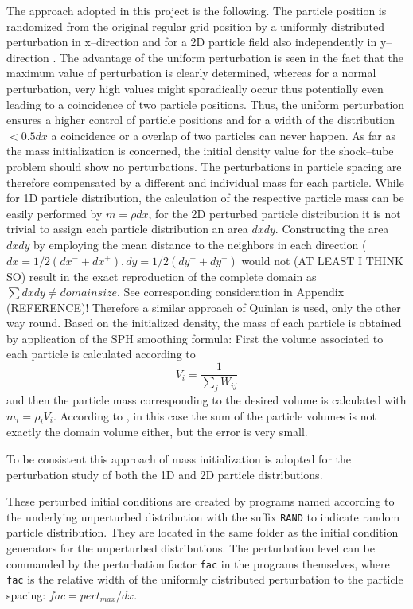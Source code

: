 \documentclass{report}
\begin{document}
 The approach adopted in this project is the following. The particle position is randomized from the original regular grid position by a uniformly distributed perturbation in x--direction and for a 2D particle field also independently in y--direction . The advantage of the uniform perturbation is seen in the fact that the maximum value of perturbation is clearly determined, whereas for a normal perturbation, very high values might sporadically occur thus potentially even leading to a coincidence of two particle positions.                                             
 Thus, the uniform perturbation ensures a higher control of particle positions and for a width of the distribution $<0.5dx$ a coincidence or a overlap of two particles can never happen. As far as the mass initialization is concerned, the initial density value for the shock--tube problem should show no perturbations. The perturbations in particle spacing are therefore compensated by a different and individual mass for each particle. While for 1D particle distribution, the calculation of the respective particle mass can be easily performed by $m=\rho dx$, for the 2D perturbed particle distribution it is not trivial to assign each particle distribution an area $dx dy$. Constructing the area $dx dy$ by employing the mean distance to the neighbors in each direction ($dx=1/2(dx^-+dx^+),dy=1/2(dy^-+dy^+)$ would not (AT LEAST I THINK SO) result in the exact reproduction of the complete domain as $\sum dxdy\neq domain size$. See corresponding consideration in Appendix (REFERENCE)!
 Therefore a similar approach of Quinlan \cite{Quinlan2006} is used, only the other way round. Based on the initialized density, the mass of each particle is obtained by application of the SPH smoothing formula: First the volume associated to each particle is calculated according to
 \begin{equation}
  V_i=\frac{1}{\sum_j W_{ij}}
 \end{equation}
 and then the particle mass corresponding to the desired volume is calculated with $m_i=\rho_i V_i$. According to \cite{Espanol2003}, in this case the sum of the particle volumes is not exactly the domain volume either, but the error is very small.

 To be consistent this approach of mass initialization is adopted for the perturbation study of both the 1D and 2D particle distributions.

 These perturbed initial conditions are created by programs named according to the underlying unperturbed distribution with the suffix {\tt RAND} to indicate random particle distribution. They are located in the same folder as the initial condition generators for the unperturbed distributions. The perturbation level can be commanded by the perturbation factor {\tt fac} in the programs themselves, where {\tt fac} is the relative width of the uniformly distributed perturbation to the particle spacing: $\mathit{fac}=\mathit{pert_{max}}/dx$.
\end{document}
